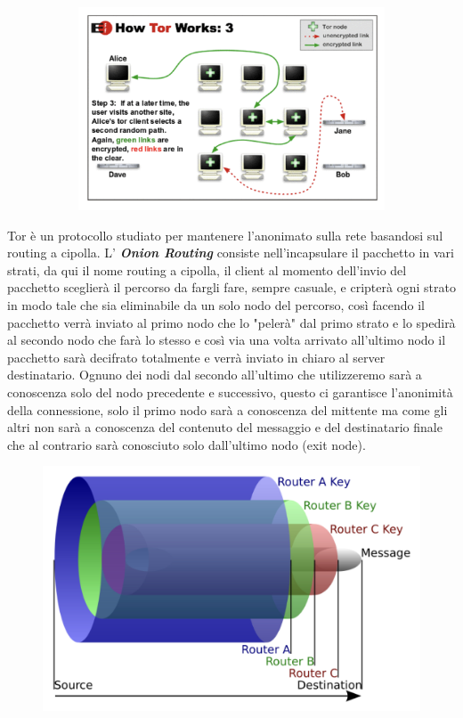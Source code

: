 \begin{figure}[h!]
    \begin{subfigure}{.5\textwidth}
        \centering
        \includegraphics[width=1\linewidth]{res/tor3.png}
    \end{subfigure}
\end{figure}
Tor è un protocollo studiato per mantenere l'anonimato sulla rete basandosi sul routing a cipolla.
L' \textbf{\textit{Onion Routing}} consiste nell'incapsulare il pacchetto in vari strati, da qui il nome routing a cipolla, il client al momento dell'invio del pacchetto sceglierà il percorso da fargli fare, sempre casuale, e cripterà ogni strato in modo tale che sia eliminabile da un solo nodo del percorso, così facendo il pacchetto verrà inviato al primo nodo che lo "pelerà" dal primo strato e lo spedirà al secondo nodo che farà lo stesso e così via una volta arrivato all'ultimo nodo il pacchetto sarà decifrato totalmente e verrà inviato in chiaro al server destinatario.
Ognuno dei nodi dal secondo all'ultimo che utilizzeremo sarà a conoscenza solo del nodo precedente e successivo, questo ci garantisce l'anonimità della connessione, solo il primo nodo sarà a conoscenza del mittente ma come gli altri non sarà a conoscenza del contenuto del messaggio e del destinatario finale che al contrario sarà conosciuto solo dall'ultimo nodo (exit node).
\begin{figure}[h!]
    \centering
    \includegraphics[width=.8\linewidth]{res/tor-encryption.png}
    \caption{}
\end{figure}
